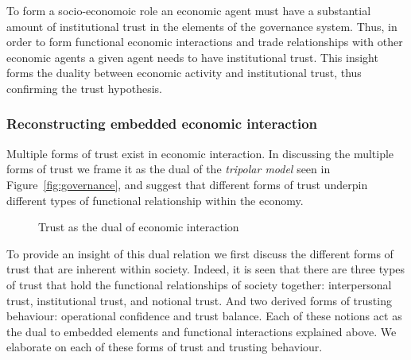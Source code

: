 \begin{subappendices}
To form a socio-economoic role an economic agent must have a substantial amount of institutional trust in the elements of the governance system. Thus, in order to form functional economic interactions and trade relationships with other economic agents a given agent needs to have institutional trust. This insight forms the duality between economic activity and institutional trust, thus confirming the trust hypothesis.

\subsubsection*{Reconstructing embedded economic interaction}

Multiple forms of trust exist in economic interaction. In discussing the multiple forms of trust we frame it as the dual of the \textit{tripolar model} seen in Figure~\ref{fig:governance}, and suggest that different forms of trust underpin different types of functional relationship within the economy.

\begin{figure}[t]
\label{dualityoftrust}
\begin{center}
\end{center}
\caption{Trust as the dual of economic interaction}
\end{figure}

To provide an insight of this dual relation we first discuss the different forms of trust that are inherent within society. Indeed, it is seen that there are three types of trust that hold the functional relationships of society together: interpersonal trust, institutional trust, and notional trust. And two derived forms of trusting behaviour: operational confidence and trust balance. Each of these notions act as the dual to embedded elements and functional interactions explained above. We elaborate on each of these forms of trust and trusting behaviour.


\end{subappendices}
